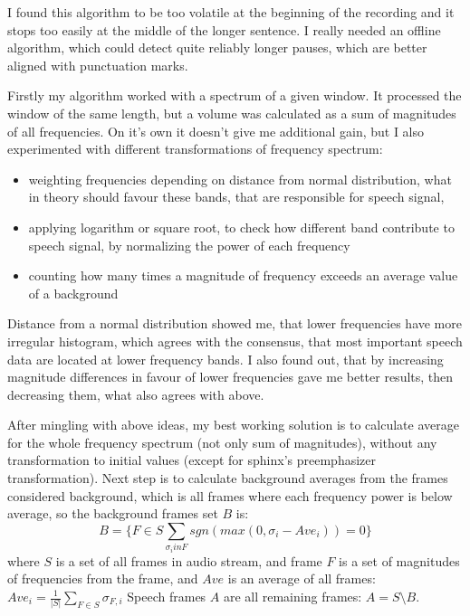\documentclass[12pt,a4paper,english]{article}
\begin{document}
I found this algorithm to be too volatile at the beginning of the recording and it stops too easily at the middle of the longer sentence. I really needed an offline algorithm, which could detect quite reliably longer pauses, which are better aligned with punctuation marks. \newline

Firstly my algorithm worked with a spectrum of a given window. It processed the window of the same length, but a volume was calculated as a sum of magnitudes of all frequencies. On it's own it doesn't give me additional gain, but I also experimented with different transformations of frequency spectrum:
\begin{itemize}
    \item weighting frequencies depending on distance from normal distribution, what in theory should favour these bands, that are responsible for speech signal,
    \item applying logarithm or square root, to check how different band contribute to speech signal, by normalizing the power of each frequency
    \item counting how many times a magnitude of frequency exceeds an average value of a background
\end{itemize}


\newpage

Distance from a normal distribution showed me, that lower frequencies have more irregular histogram, which agrees with the consensus, that most important speech data are located at lower frequency bands. \newline 
I also found out, that by increasing magnitude differences in favour of lower frequencies gave me better results, then decreasing them, what also agrees with above. \newline

After mingling with above ideas, my best working solution is to calculate average for the whole frequency spectrum (not only sum of magnitudes), without any transformation to initial values (except for sphinx's preemphasizer transformation).
Next step is to calculate background averages from the frames considered background, which is all frames where each frequency power is below average, so the background frames set $B$ is:
\begin{equation}
    B = \{ F \in S \sum_{\sigma_i in F} sgn(max(0, \sigma_i - Ave_i)) = 0 \}
\end{equation}
where $S$ is a set of all frames in audio stream, and frame $F$ is a set of magnitudes of frequencies from the frame,
and $Ave$ is an average of all frames: $Ave_i = \frac 1 {|S|} \sum_{F \in S} \sigma_{F, i}$
Speech frames $A$ are all remaining frames: $A = S \setminus B$. \newline
\end{document}
